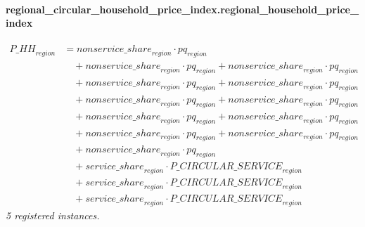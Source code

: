 \documentclass[11pt]{article}
\begin{document}
\paragraph{regional\_circular\_household\_price\_index.regional\_household\_price\_index}
\begin{align*}
{P\_HH}_{region} &= {nonservice\_share}_{region} \cdot pq_{region}\\
&\quad {}+ {nonservice\_share}_{region} \cdot pq_{region} + {nonservice\_share}_{region} \cdot pq_{region}\\
&\quad {}+ {nonservice\_share}_{region} \cdot pq_{region} + {nonservice\_share}_{region} \cdot pq_{region}\\
&\quad {}+ {nonservice\_share}_{region} \cdot pq_{region} + {nonservice\_share}_{region} \cdot pq_{region}\\
&\quad {}+ {nonservice\_share}_{region} \cdot pq_{region} + {nonservice\_share}_{region} \cdot pq_{region}\\
&\quad {}+ {nonservice\_share}_{region} \cdot pq_{region} + {nonservice\_share}_{region} \cdot pq_{region}\\
&\quad {}+ {nonservice\_share}_{region} \cdot pq_{region}\\
&\quad {}+ {service\_share}_{region} \cdot {P\_CIRCULAR\_SERVICE}_{region}\\
&\quad {}+ {service\_share}_{region} \cdot {P\_CIRCULAR\_SERVICE}_{region}\\
&\quad {}+ {service\_share}_{region} \cdot {P\_CIRCULAR\_SERVICE}_{region}
\end{align*}
\noindent\emph{5 registered instances.}\par
\end{document}
